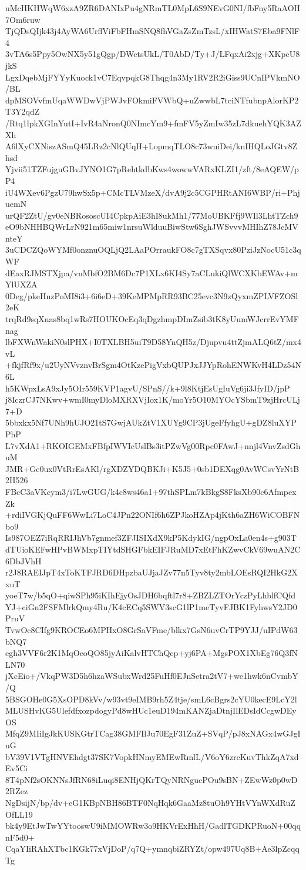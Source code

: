uMcHKHWqW6xzA9ZR6DANIxPu4gNRmTL0MpL6S9NEvG0NI/fbFny5RaAOH7Om6ruw
TjQDsQIjk43j4AyWA6UrflViFbFHmSNQ8fhVGaZsZmTzsL/xIHWatS7Eba9FNlF4
3vTA6s5Ppy5OwNX5y51gQgp/DWctsUkL/T0AbD/Ty+J/LFqxAi2xjg+XKpcU8jkS
LgxDqebMjFYYyKuock1vC7EqvpqkG8Thqg4n3My1RV2R2iGiss9UCnIPVkmNO/BL
dpMSOVvfmUqaWWDwVjPWJvFOkmiFVWbQ+uZwwbL7tciNTfubnpAlorKP2T3Y2qdZ
/Rtq1lpkXGInYutI+IvR4aNronQ0NImcYm9+fmFV5yZmIw35zL7dkuehYQK3AZXh
A6lXyCXNiszASmQ45LRz2cNlQUqH+LopmqTLO8c73wuiDei/knIHQLoJGtv8Zhsd
Yjvii51TZFujguGBvJYNO1G7pRehtkdbKws4wowwVARxKLZI1/zft/8eAQEW/pP4
iU4WXev6PgzU79hwSx5p+CMcTLVMzeX/dvA9j2c5CGPHRtANI6WBP/ri+PhjuemN
urQF2ZtU/gv0eNBRososcUI4CpkpAiE3hI8ukMh1/77MoUBKFfj9WIl3LhtTZch9
eO9bNHHBQWrLrN921m65miw1nrsuWlduuBiwStw6SghJWSvvvMHIhZ78JcMVnteY
3uCDCZQoWYMf0onznuOQLjQ2LAaPOrraukFO8c7gTXSqvx80PziJzNocU51c3qWF
dEaxRJMSTXjpa/vnMbfO2BM6Dc7P1XLx6KI4Sy7aCLukiQlWCXKbEWAv+mYlUXZA
0Deg/pkeHnzPoMI8i3+6i6eD+39KeMPMpRR93BC25evc3N9zQyxmZPLVFZOSl2eK
trqRd9sqXnas8bq1wRs7HOUKOcEq3qDgzhmpDImZsib3tK8yUumWJcrrEvYMFnag
lbFXWnWakiN0slPHX+I0TXLBH5uiT9D58YnQH5z/Djupvu4ttZjmALQ6tZ/mx4vL
+fkjfRf9x/u2UyNVvznvBrSgm4OtKzePigVxbQUPJxJJYpRohENWKvH4LDz54N6L
h5KWpxLsA9xJy5OIr559KVP1agvU/SPnS//k+9l8KtjEsUgIuVg6ji3JfyID/jpP
j8IczrCJ7NKwv+wmI0myDloMXRXVjIox1K/moYr5O10MYOcYSbmT9zjHrcULj7+D
5bbxkx5Nf7UNh9hUJO21tS7GwjAUkZtV1XUYg9CP3jUgeFfyhgU+gDZ8luXYPPhP
L7vXdA1+RKOIGEMxFBfpIWVIcUslBs3itPZwVg00Rpc0FAwJ+nnjl4VnvZsdGhuM
JMR+Ge0ux0VtRrEsAKl/rgXDZYDQBKJi+K5J5+0sb1DEXqg0AvWCsvYrNtB2H526
FBcC3aVKcym3/i7LwGUG/k4c8ws46a1+97thSPLm7kBkgS8FksXb90c6AfmpexZk
+rdiIVGKjQuFF6WwLi7LoC4JPn22ONIf6h6ZPJkoHZAp4jKth6aZH6WiCOBFNbo9
Is987OEZ7iRqRRIJhVb7gnmef3ZFJISIXdX9kP5KdykIG/ngpOxLa0en4s+g903T
dTUioKEFwHPvBWMxpTIYtdSHGFbkEIFJRuMD7xEtFhKZwvCkV69wuAN2C6DbJVhH
r2J8RAEIJpT4xToKTFJRD6DHpzbaUJjaJZv77n5Tyv8ty2mbLOEsRQI2HkG2XxuT
yoeT7w/b5qO+qiwSPh95iKIhEjyOsJDH6bqftl7r8+ZBZLZTOrYczPyLhblfCQfd
YJ+ciGn2FSFMlrkQmy4Ru/K4cECq5SWV3scG1lP1meTyvFJBK1FyhwsY2JD0PruV
TvwOc8CIfg9KROCEo6MPHxO8GrSaVFme/blkx7GsN6uvCrTP9YJJ/uIPdW63bNQ7
egh3VVF6r2K1MqOcoQO85jyAiKalvHTChQcp+yj6PA+MgsPOX1XbEg76Q3fNLN70
jXcEio+/VkqPW3D5h6hzaWSubxWrd25FuHf0EJnSetra2tV7+we1hwk6nCvmbY/Q
5BSGOHe0G5XsOPD8kVv/w93vt9eIMB9rh5Z4tje/smL6cBgrs2cYU0kecE9LcY2l
MLUSHvKG5UlefdfxozpdogyPd8wHUc1euD194mKANZjaDtnjIlEDsIdCcgwDEyOS
MfqZ9MIiIgJkKUSKGtrTCag38GMFIlJu70EgF31ZuZ+SVqP/pJ8xNAGx4wGJgIuG
bV39V1VTgHNVEhdgt37SK7VopkHNmyEMEwRmlL/V6oY6zrcKuvThkZqA7xdEv5Ci
8T4pNf2sOKNNsJfRN68iLuqi8ENHjQKrTQyNRNgucPOu9sBN+ZEwWz0p0wD2RZez
NgDsijN/bp/dv+eG1KBpNBH86BTF0NqHqk6GaaMz8tuOh9YHtVYnWXdRuZOfLL19
bk4y9EtJwTwYYtooswU9iMMOWRw3o9HKVrExHhH/GadlTGDKPRuoN+00qqnF5d0+
CqaYIiRAhXTbc1KGk77xVjDoP/q7Q+ymnqbiZRYZt/opw497Uq8B+Ae3lpZcqqTg
